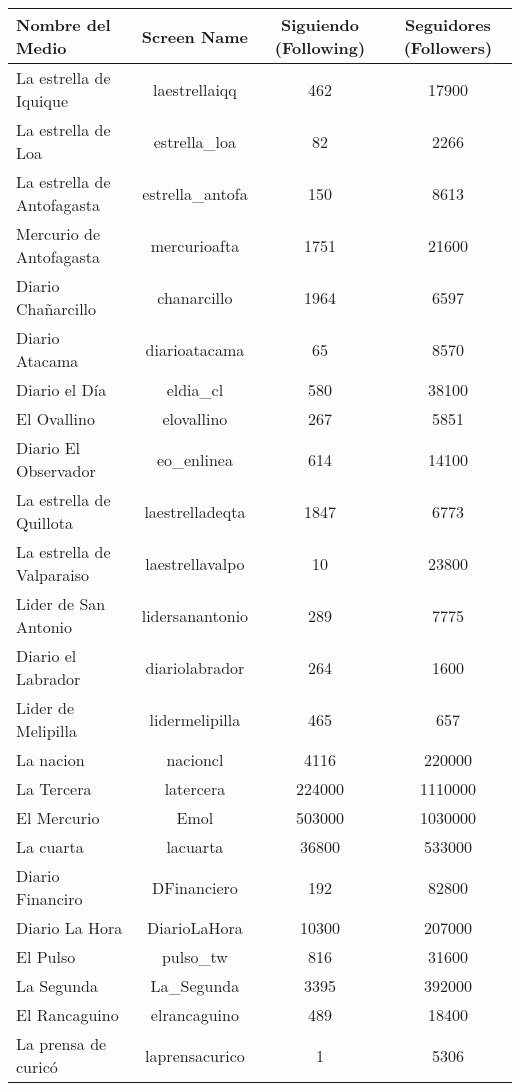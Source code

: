 \begin{center}
	\centering
	\begin{longtable}{| l | c | c | c |} \hline
		Nombre del Medio	&	Screen Name	&	Siguiendo (Following)	&	Seguidores (Followers)	\\ \hline
		La estrella de Iquique	&	laestrellaiqq	&	462	&	17900	\\ \hline
		La estrella de Loa	&	estrella\_loa 	&	82	&	2266	\\ \hline
		La estrella de Antofagasta	&	estrella\_antofa 	&	150	&	8613	\\ \hline
		Mercurio de Antofagasta	&	mercurioafta	&	1751	&	21600	\\ \hline
		Diario Chañarcillo	&	chanarcillo	&	1964	&	6597	\\ \hline
		Diario Atacama	&	diarioatacama	&	65	&	8570	\\ \hline
		Diario el Día	&	eldia\_cl	&	580	&	38100	\\ \hline
		El Ovallino	&	elovallino	&	267	&	5851	\\ \hline
		Diario El Observador	&	eo\_enlinea	&	614	&	14100	\\ \hline
		La estrella de Quillota	&	laestrelladeqta	&	1847	&	6773	\\ \hline
		La estrella de Valparaiso	&	laestrellavalpo 	&	10	&	23800	\\ \hline
		Lider de San Antonio	&	lidersanantonio	&	289	&	7775	\\ \hline
		Diario el Labrador	&	diariolabrador	&	264	&	1600	\\ \hline
		Lider de Melipilla	&	lidermelipilla 	&	465	&	657	\\ \hline
		La nacion	&	nacioncl	&	4116	&	220000	\\ \hline
		La Tercera	&	latercera	&	224000	&	1110000	\\ \hline
		El Mercurio	&	Emol	&	503000	&	1030000	\\ \hline
		La cuarta	&	lacuarta	&	36800	&	533000	\\ \hline
		Diario Financiro	&	DFinanciero	&	192	&	82800	\\ \hline
		Diario La Hora	&	DiarioLaHora	&	10300	&	207000	\\ \hline
		El Pulso &	pulso\_tw	&	816	&	31600	\\ \hline
		La Segunda	&	La\_Segunda	&	3395	&	392000	\\ \hline
		El Rancaguino	&	elrancaguino	&	489	&	18400	\\ \hline
		La prensa de curicó	&	laprensacurico	&	1	&	5306	\\ \hline

\end{longtable}
\end{center}
